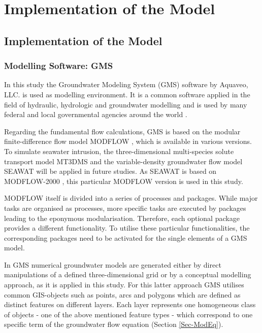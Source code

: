 
\chapter{Implementation of the Model}
\label{Chap-ImplMod}


\section{Implementation of the Model}

\subsection{Modelling Software: GMS}
\label{Sec-GMS}

In this study the Groundwater Modeling System (GMS) software by Aquaveo, LLC. is used as modelling environment. 
It is a common software applied in the field of hydraulic, hydrologic and groundwater modelling and is used by many federal and local governmental agencies around the world \parencite{Aquaveo.2021}.

Regarding the fundamental flow calculations, GMS is based on the modular finite-difference flow model MODFLOW \parencite{McDonald.1988}, which is available in various versions. 
To simulate seawater intrusion, the three-dimensional multi-species solute transport model MT3DMS \parencite{Zheng.1999} and the variable-density groundwater flow model SEAWAT \parencite{Langevin.2009} will be applied in future studies. 
As SEAWAT is based on MODFLOW-2000 \parencite{Harbaugh.2000}, this particular MODFLOW version is used in this study.

MODFLOW itself is divided into a series of processes and packages. 
While major tasks are organised as processes, more specific tasks are executed by packages leading to the eponymous modularisation. 
Therefore, each optional package provides a different functionality. 
To utilise these particular functionalities, the corresponding packages need to be activated for the single elements of a GMS model.

In GMS numerical groundwater models are generated either by direct manipulations of a defined three-dimensional grid or by a conceptual modelling approach, as it is applied in this study. 
For this latter approach GMS utilises common GIS-objects such as points, arcs and polygons which are defined as distinct features on different layers. 
Each layer represents one homogeneous class of objects - one of the above mentioned feature types - which correspond to one specific term of the groundwater flow equation (Section \ref{Sec-ModEq}).

